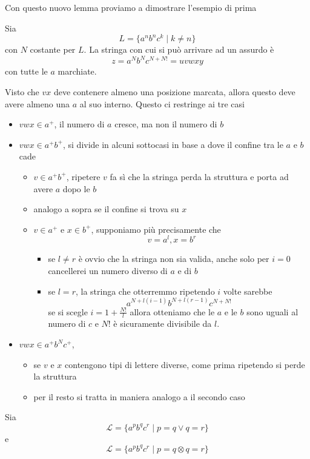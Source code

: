 \documentclass[12pt]{report}
\theoremstyle{definition}
\theoremstyle{regard}
\begin{document}
Con questo nuovo lemma proviamo a dimostrare l'esempio di prima
\begin{tcolorbox}[breakable]
	Sia
	$$ L = \{ a^n b^n c^k \mid k \neq n \} $$
	con $N$ costante per $L$.
	La stringa con cui si può arrivare ad un assurdo è
	$$ z = a^N b^N c^{N + N!} = uvwxy $$
	con tutte le $a$ marchiate.

	Visto che $vx$ deve contenere almeno una posizione marcata, allora questo deve avere almeno una $a$ al suo interno.
	Questo ci restringe ai tre casi
	\begin{itemize}
		\item $vwx \in a^+$, il numero di $a$ cresce, ma non il numero di $b$
		\item $vwx \in a^+ b^+$, si divide in alcuni sottocasi in base a dove il confine tra le $a$ e $b$ cade
			\begin{itemize}
				\item $v \in a^+ b^+$, ripetere $v$ fa sì che la stringa perda la struttura e porta ad avere $a$ dopo le $b$
				\item analogo a sopra se il confine si trova su $x$
				\item $v \in a^+$ e $x \in b^+$, supponiamo più precisamente che
					$$ v = a^l, x = b^r $$
					\begin{itemize}
						\item se $l \neq r$ è ovvio che la stringa non sia valida, anche solo per $i = 0$ cancellerei un numero diverso di $a$ e di $b$
						\item se $l = r$, la stringa che otterremmo ripetendo $i$ volte sarebbe
							$$ a^{N + l(i - 1)} b^{N + l(r - 1)} c^{N + N!} $$
							se si scegle $i = 1 + \frac{N!}{l}$ allora otteniamo che le $a$ e le $b$ sono uguali al numero di $c$ e $N!$ è sicuramente divisibile da $l$.
					\end{itemize}
			\end{itemize}
		\item $vwx \in a^+ b^N c^+ $, 
			\begin{itemize}
				\item se $v$ e $x$ contengono tipi di lettere diverse, come prima ripetendo si perde la struttura
				\item per il resto si tratta in maniera analogo a il secondo caso
			\end{itemize}
	\end{itemize}
\end{tcolorbox}

\begin{tcolorbox}[breakable]
	Sia
	$$ \mathcal{L} = \{ a^p b^q c^r \mid p = q \vee q = r \} $$
	e 
	$$ \mathcal{L} = \{ a^p b^q c^r \mid p = q \otimes q = r \} $$
\end{tcolorbox}
\end{document}
